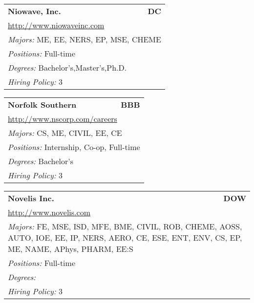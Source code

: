 \documentclass[twoside]{article}
\begin{document}
\begin{center}
\begin{multicols}{3}
\begin{FlushLeft}
\begin{minipage}{.9\columnwidth}\begin{tabularx}{.95\columnwidth}{Xr}
                 {\Large\bf Niowave, Inc.} & {\Large\bf DC}\\
    \multicolumn{2}{p{.95\columnwidth}}{\url{http://www.niowaveinc.com}}\\
    \multicolumn{2}{p{.95\columnwidth}}{\emph{Majors:} ME, EE, NERS, EP, MSE, CHEME}\\
    \multicolumn{2}{p{.95\columnwidth}}{\emph{Positions:} Full-time}\\
    \multicolumn{2}{p{.95\columnwidth}}{\emph{Degrees:} Bachelor's,Master's,Ph.D.}\\
    \multicolumn{2}{p{.95\columnwidth}}{\emph{Hiring Policy:} 3}\\
    \end{tabularx}
    
\end{minipage}
 
\begin{minipage}{.9\columnwidth}\begin{tabularx}{.95\columnwidth}{Xr}
                 {\Large\bf Norfolk Southern} & {\Large\bf BBB}\\
    \multicolumn{2}{p{.95\columnwidth}}{\url{http://www.nscorp.com/careers}}\\
    \multicolumn{2}{p{.95\columnwidth}}{\emph{Majors:} CS, ME, CIVIL, EE, CE}\\
    \multicolumn{2}{p{.95\columnwidth}}{\emph{Positions:} Internship, Co-op, Full-time}\\
    \multicolumn{2}{p{.95\columnwidth}}{\emph{Degrees:} Bachelor's}\\
    \multicolumn{2}{p{.95\columnwidth}}{\emph{Hiring Policy:} 3}\\
    \end{tabularx}
    
\end{minipage}
 
\begin{minipage}{.9\columnwidth}\begin{tabularx}{.95\columnwidth}{Xr}
                 {\Large\bf Novelis Inc.} & {\Large\bf DOW}\\
    \multicolumn{2}{p{.95\columnwidth}}{\url{http://www.novelis.com}}\\
    \multicolumn{2}{p{.95\columnwidth}}{\emph{Majors:} FE, MSE, ISD, MFE, BME, CIVIL, ROB, CHEME, AOSS, AUTO, IOE, EE, IP, NERS, AERO, CE, ESE, ENT, ENV, CS, EP, ME, NAME, APhys, PHARM, EE:S}\\
    \multicolumn{2}{p{.95\columnwidth}}{\emph{Positions:} Full-time}\\
    \multicolumn{2}{p{.95\columnwidth}}{\emph{Degrees:} }\\
    \multicolumn{2}{p{.95\columnwidth}}{\emph{Hiring Policy:} 3}\\
    \end{tabularx}
    

\end{minipage}
\end{FlushLeft}
\end{multicols}
\end{center}
\end{document}
